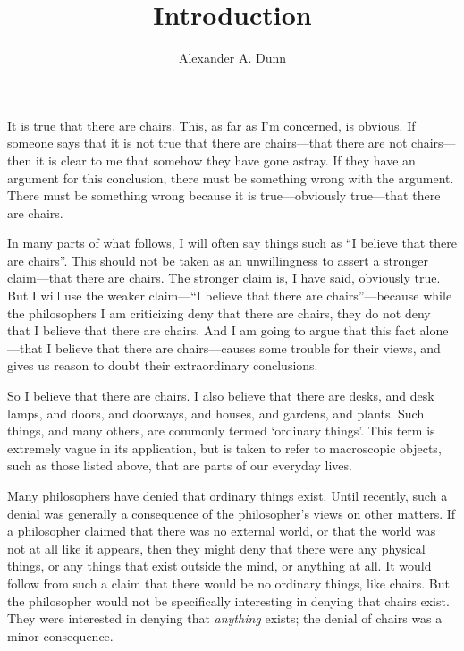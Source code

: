 \documentclass[11pt]{article}
\title{Introduction}
\author{Alexander A. Dunn}
\begin{document}
\ifstandalone
\maketitle
\begin{spacing}{1.5}
\fi

It is true that there are chairs.  This, as far as I'm concerned, is
obvious.  If someone says that it is not true that there are
chairs---that there are not chairs---then it is clear to me that
somehow they have gone astray.  If they have an argument for this
conclusion, there must be something wrong with the argument.  There
must be something wrong because it is true---obviously true---that
there are chairs.

In many parts of what follows, I will often say things such as ``I
believe that there are chairs''.  This should not be taken as an
unwillingness to assert a stronger claim---that there are chairs.  The
stronger claim is, I have said, obviously true.  But I will use the
weaker claim---``I believe that there are chairs''---because while the
philosophers I am criticizing deny that there are chairs, they do not
deny that I believe that there are chairs.  And I am going to argue
that this fact alone---that I believe that there are chairs---causes
some trouble for their views, and gives us reason to doubt their
extraordinary conclusions.

So I believe that there are chairs.  I also believe that there are
desks, and desk lamps, and doors, and doorways, and houses, and
gardens, and plants.  Such things, and many others, are commonly
termed `ordinary things'.  This term is extremely vague in its
application, but is taken to refer to macroscopic objects, such as
those listed above, that are parts of our everyday lives.

Many philosophers have denied that ordinary things exist.  Until
recently, such a denial was generally a consequence of the
philosopher's views on other matters.  If a philosopher claimed that
there was no external world, or that the world was not at all like it
appears, then they might deny that there were any physical things, or
any things that exist outside the mind, or anything at all.  It would
follow from such a claim that there would be no ordinary things, like
chairs.  But the philosopher would not be specifically interesting in
denying that chairs exist.  They were interested in denying that {\em
  anything} exists; the denial of chairs was a minor consequence.


\end{spacing}
\end{document}
